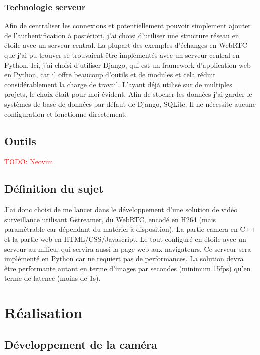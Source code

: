 \documentclass[12pt, a4paper]{report}
\makeatletter
\newcommand\TODO[1]{\textcolor{red}{TODO\@: #1}}
\makeatother
\begin{document}
\subsection{Technologie serveur}
Afin de centraliser les connexions et potentiellement pouvoir simplement ajouter de l'authentification à postériori, j'ai choisi d'utiliser une structure réseau en étoile avec un serveur central.\newline
La plupart des exemples d'échanges en WebRTC que j'ai pu trouver se trouvaient être implémentés avec un serveur central en Python.\newline
Ici, j'ai choisi d'utiliser Django, qui est un framework d'application web en Python, car il offre beaucoup d'outils et de modules et cela réduit considérablement la charge de travail. L'ayant déjà utilisé sur de multiples projets, le choix était pour moi évident.\newline
Afin de stocker les données j'ai garder le systèmes de base de données par défaut de Django, SQLite. Il ne nécessite aucune configuration et fonctionne directement.

\section{Outils}
\TODO{Neovim}

\section{Définition du sujet}
J'ai donc choisi de me lancer dans le développement d'une solution de vidéo surveillance utilisant Gstreamer, du WebRTC, encodé en H264 (mais paramétrable car dépendant du matériel à disposition). La partie camera en C++ et la partie web en HTML/CSS/Javascript.\newline
Le tout configuré en étoile avec un serveur au milieu, qui servira aussi la page web aux navigateurs. Ce serveur sera implémenté en Python car ne requiert pas de performances.\newline
La solution devra être performante autant en terme d'images par secondes (minimum 15fps) qu'en terme de latence (moins de 1s).\newline

\chapter{Réalisation}
\section{Développement de la caméra}
\end{document}
